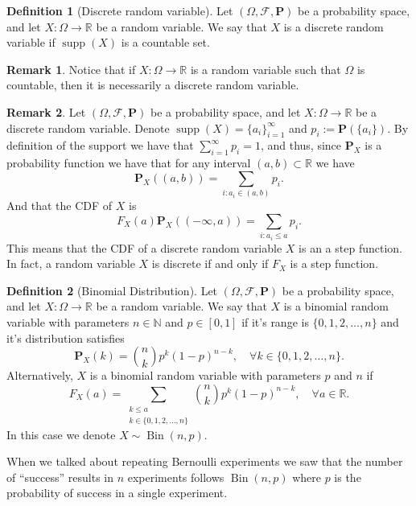 \documentclass[11pt,a4paper]{article}
\theoremstyle{definition}
\newtheorem{definition}{Definition}[section]
\newtheorem{remark}{Remark}[section]
\theoremstyle{plain}
\DeclareMathOperator{\supp}{supp}
\DeclareMathOperator{\Bin}{Bin}
\newcommand{\N}{\mathbb{N}}
\newcommand{\R}{\mathbb{R}}
\newcommand{\Prob}{\mathbf{P}}
\begin{document}
  \begin{definition}[Discrete random variable]
    Let $(\Omega ,\mathcal F, \Prob)$ be a probability space,
    and let $X \colon \Omega \to \R$ be a random variable.
    We say that $X$ is a discrete random variable if $\supp(X)$ is a 
    countable set.
  \end{definition}
  \begin{remark}
    Notice that if $X \colon \Omega \to \R$ is a random variable such
    that $\Omega$ is countable, then it is necessarily a discrete random
    variable.
  \end{remark}
  \begin{remark}
    Let $(\Omega ,\mathcal F, \Prob)$ be a probability space,
    and let $X \colon \Omega \to \R$ be a discrete random variable.
    Denote $\supp(X) = \{a_i\}_{i=1}^{\infty}$ and $p_i := \Prob(\{a_i\})$.
    By definition of the support we have that $\sum_{i=1}^{\infty} p_i = 1$,
    and thus, since $\Prob_X$ is a probability function we have that
    for any interval $(a,b) \subset \R$ we have
    \[
      \Prob_X \left((a,b)\right) = \sum_{i \colon a_i \in (a,b)} p_i.
    \]
    And that the CDF of $X$ is
    \[
      F_X(a)
      \Prob_X \left((-\infty,a)\right) = \sum_{i \colon a_i \le a} p_i.
    \]
    This means that the CDF of a discrete random variable $X$ is an a step
    function. In fact, a random variable $X$ is discrete if and only if
    $F_X$ is a step function.
  \end{remark}

  \begin{definition}[Binomial Distribution]
    Let $(\Omega ,\mathcal F, \Prob)$ be a probability space,
    and let $X \colon \Omega \to \R$ be a random variable.
    We say that $X$ is a binomial random variable with parameters
    $n \in \N$ and $p \in [0,1]$ if it's range is $\{0,1,2,\dots,n\}$ and
    it's distribution satisfies
    \[
      \Prob_X(k) = \binom{n}{k} p^k (1-p)^{n-k}, \quad 
      \forall k \in \{0,1,2,\dots,n\}.
    \]
    Alternatively, $X$ is a binomial random variable with parameters
    $p$ and $n$ if
    \[
      F_X(a) = \sum_{\substack{k \le a \\ k \in \{0,1,2,\dots,n\}}}
      \binom{n}{k} p^k (1-p)^{n-k}, \quad \forall a \in \R.
    \]
    In this case we denote $X \sim \Bin(n,p)$.
  \end{definition}
  When we talked about repeating Bernoulli experiments we saw that the number
  of ``success'' results in $n$ experiments follows $\Bin(n,p)$ where
  $p$ is the probability of success in a single experiment.
  
\end{document}
